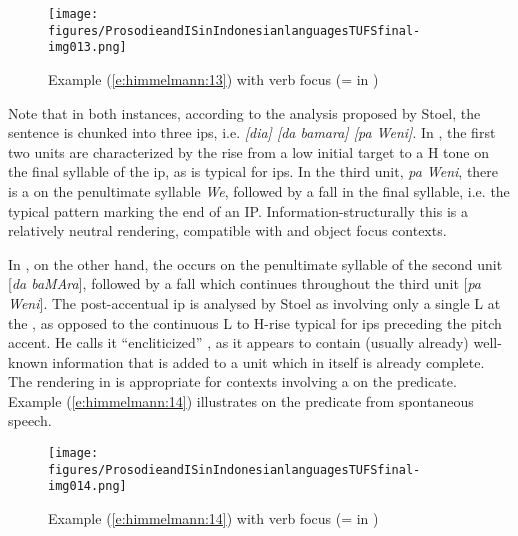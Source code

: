 \documentclass[output=paper
,modfonts
,nonflat]{langsci/langscibook}
\begin{document}
\begin{figure}
	\texttt{[image: figures/ProsodieandISinIndonesianlanguagesTUFSfinal-img013.png]}
	\caption{Example (\ref{e:himmelmann:13}) with verb focus (=  in \citealt[127]{Stoel2007})}
	\label{f18}
\end{figure}

\noindent
Note that in both instances, according to the analysis proposed by Stoel, the sentence is chunked into three ips, i.e. \textit{[dia] [da bamara] [pa Weni]}. In , the first two units are characterized by the rise from a low initial target to a H tone on the final syllable of the ip, as is typical for ips. In the third unit, \textit{pa Weni}, there is a  on the penultimate syllable \textit{We}, followed by a fall in the final syllable, i.e. the typical pattern marking the end of an IP. Information-structurally this is a relatively neutral rendering, compatible with  and object focus contexts.

In , on the other hand, the  occurs on the penultimate syllable of the second unit [\textit{da baMAra}], followed by a fall which continues throughout the third unit [\textit{pa Weni}]. The post-accentual ip is analysed by Stoel as involving only a single L  at the , as opposed to the continuous L to H-rise typical for ips preceding the pitch accent. He calls it “encliticized” \citep[121]{Stoel2007}, as it appears to contain (usually already) well-known information that is added to a unit which in itself is already complete. The rendering in  is appropriate for contexts involving a  on the predicate. Example (\ref{e:himmelmann:14}) illustrates  on the predicate from spontaneous speech.


\begin{figure}
	\texttt{[image: figures/ProsodieandISinIndonesianlanguagesTUFSfinal-img014.png]}
	\caption{Example (\ref{e:himmelmann:14}) with verb focus (=  in \citealt[128]{Stoel2007})}
	\label{f19}
\end{figure}
\end{document}
